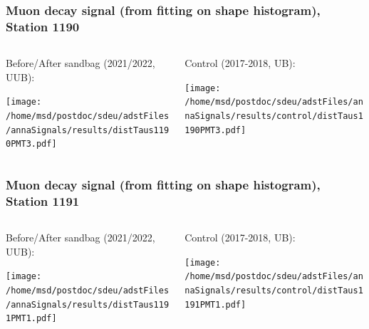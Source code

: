 \documentclass[aspectratio=169]{beamer}
\begin{document}
\begin{frame}
  \frametitle{Muon decay signal (from fitting on shape histogram), Station 1190}
  
  \begin{columns}[T,c]
    \begin{column}{.5\textwidth}
      Before/After sandbag (2021/2022, UUB):
      \vspace{.3cm}

      \texttt{[image: /home/msd/postdoc/sdeu/adstFiles/annaSignals/results/distTaus1190PMT3.pdf]}
    \end{column}
    \begin{column}{.5\textwidth}
      Control (2017-2018, UB):
      \vspace{0.3cm}

      \texttt{[image: /home/msd/postdoc/sdeu/adstFiles/annaSignals/results/control/distTaus1190PMT3.pdf]}
    \end{column}    
\end{columns}
\end{frame}


\begin{frame}
  \frametitle{Muon decay signal (from fitting on shape histogram), Station 1191}
  
  \begin{columns}[T,c]
    \begin{column}{.5\textwidth}
      Before/After sandbag (2021/2022, UUB):
      \vspace{.3cm}

      \texttt{[image: /home/msd/postdoc/sdeu/adstFiles/annaSignals/results/distTaus1191PMT1.pdf]}
    \end{column}
    \begin{column}{.5\textwidth}
      Control (2017-2018, UB):
      \vspace{0.3cm}

      \texttt{[image: /home/msd/postdoc/sdeu/adstFiles/annaSignals/results/control/distTaus1191PMT1.pdf]}
    \end{column}
  \end{columns}
\end{frame}
\end{document}

